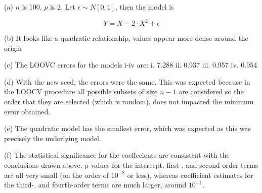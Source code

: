 \documentclass{article}
\begin{document}
    (a)
    $n$ is 100, $p$ is 2. Let $\epsilon \sim N[0,1]$, then the model is

    \[Y = X-2 \cdot X^2 + \epsilon\]

    (b) It looks like a quadratic relationship, values appear more dense around the origin

    (c) The LOOVC errors for the models i-iv are:
    i. 7.288
    ii. 0.937 
    iii. 0.957 
    iv. 0.954

    (d) With the new seed, the errors were the same. This was expected 
    because in the LOOCV procedure all possible subsets of size $n-1$ are 
    considered so the order that they are selected (which is random), does not 
    impacted the minimum error obtained.

    (e) The quadratic model has the smallest error, which was expected as this 
    was precisely the underlying model.

    (f) The statistical significance for the coeffecients are consistent with the 
    conclusions drawn above, p-values for the intercept, first-, and second-order terms are all 
    very small (on the order of $10^{-8}$ or less), whereas coefficient estimates for the third-, 
    and fourth-order terms are much larger, around $10^{-1}$.
 
\end{document}
